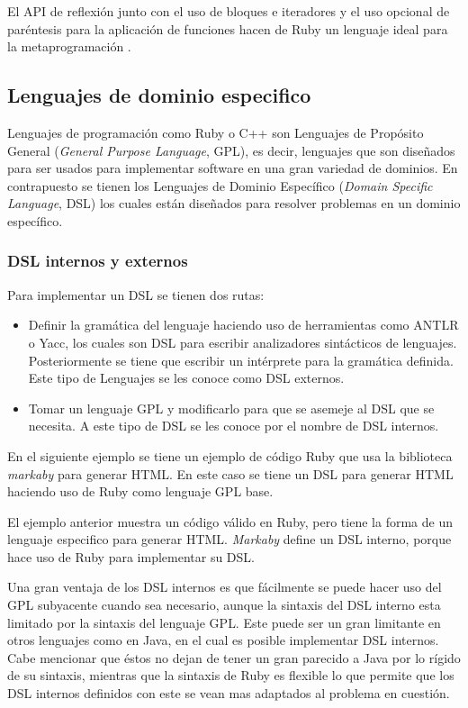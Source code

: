 El API de reflexión junto con el uso de bloques e iteradores y el uso opcional de
paréntesis para la aplicación de funciones hacen de Ruby un lenguaje
ideal para la metaprogramación \cite{24_matsumoto_2008}.

\subsection{Lenguajes de dominio especifico}
Lenguajes de programación como Ruby o C++ son Lenguajes de Propósito General
(\textit{General Purpose Language}, GPL), es decir, lenguajes que son diseñados
para ser usados para implementar software en una gran variedad de dominios.
En contrapuesto se tienen los Lenguajes de Dominio Específico
(\textit{Domain Specific Language}, DSL) los cuales están diseñados para resolver
problemas en un dominio específico.

\subsubsection{DSL internos y externos}

Para implementar un DSL se tienen dos rutas:
\begin{itemize}
\item Definir la gramática del lenguaje haciendo uso de herramientas como
  ANTLR o Yacc, los cuales son DSL para escribir analizadores sintácticos
  de lenguajes. Posteriormente se tiene que escribir un intérprete para
  la gramática definida. Este tipo de Lenguajes se les conoce como DSL externos.
\item Tomar un lenguaje GPL y modificarlo para que se asemeje al DSL que
  se necesita. A este tipo de DSL se les conoce por el nombre de DSL internos.
\end{itemize}

En el siguiente ejemplo se tiene un ejemplo de código Ruby que usa la biblioteca
\textit{markaby} para generar HTML. En este caso se tiene un DSL para generar HTML
haciendo uso de Ruby como lenguaje GPL base.


El ejemplo anterior muestra un código válido en Ruby, pero tiene la forma de un lenguaje
especifico para generar HTML. \textit{Markaby} define un DSL interno, porque hace uso
de Ruby para implementar su DSL.

Una gran ventaja de los DSL internos es que fácilmente se puede hacer uso del GPL
subyacente cuando sea necesario, aunque la sintaxis del DSL interno esta limitado
por la sintaxis del lenguaje GPL. Este puede ser un gran limitante en otros lenguajes
como en Java, en el cual es posible implementar DSL internos. Cabe mencionar que
éstos no dejan de tener un gran parecido a Java por lo rígido de su sintaxis, mientras
que la sintaxis de Ruby es flexible lo que permite que los DSL internos definidos
con este se vean mas adaptados al problema en cuestión.
